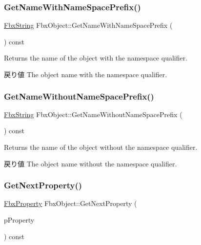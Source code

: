 \subsubsection{\texorpdfstring{Get\+Name\+With\+Name\+Space\+Prefix()}{GetNameWithNameSpacePrefix()}}
{\footnotesize\ttfamily \hyperlink{class_fbx_string}{Fbx\+String} Fbx\+Object\+::\+Get\+Name\+With\+Name\+Space\+Prefix (\begin{DoxyParamCaption}{ }\end{DoxyParamCaption}) const}

Returns the name of the object with the namespace qualifier. \begin{DoxyReturn}{戻り値}
The object name with the namespace qualifier. 
\end{DoxyReturn}
\mbox{\label{class_fbx_object_ae378979d85476e931375e30b6498f8db}} 
\subsubsection{\texorpdfstring{Get\+Name\+Without\+Name\+Space\+Prefix()}{GetNameWithoutNameSpacePrefix()}}
{\footnotesize\ttfamily \hyperlink{class_fbx_string}{Fbx\+String} Fbx\+Object\+::\+Get\+Name\+Without\+Name\+Space\+Prefix (\begin{DoxyParamCaption}{ }\end{DoxyParamCaption}) const}

Returns the name of the object without the namespace qualifier. \begin{DoxyReturn}{戻り値}
The object name without the namespace qualifier. 
\end{DoxyReturn}
\mbox{\label{class_fbx_object_a34e7ffc0f49a4e3be8db6310efccd020}} 
\subsubsection{\texorpdfstring{Get\+Next\+Property()}{GetNextProperty()}}
{\footnotesize\ttfamily \hyperlink{class_fbx_property}{Fbx\+Property} Fbx\+Object\+::\+Get\+Next\+Property (\begin{DoxyParamCaption}\item[{const \hyperlink{class_fbx_property}{Fbx\+Property} \&}]{p\+Property }\end{DoxyParamCaption}) const\hspace{0.3cm}{\ttfamily [inline]}}

